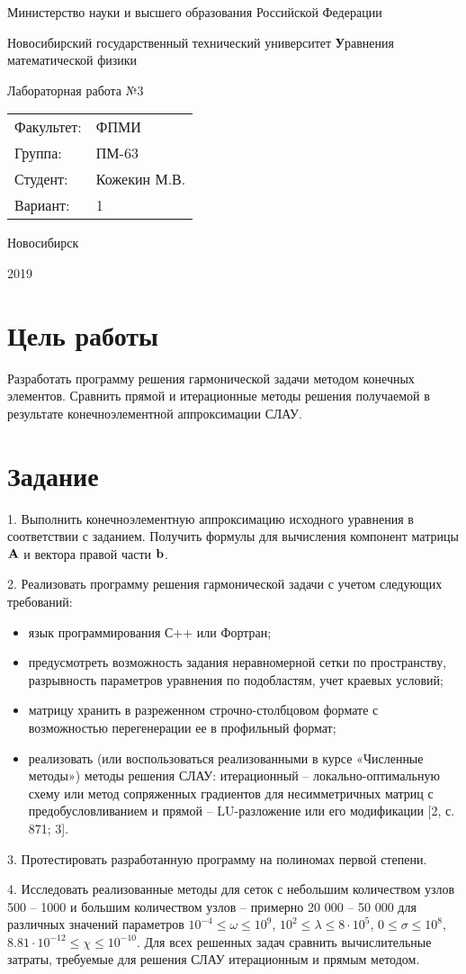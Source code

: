 \documentclass[12pt, a4paper]{article}
\newcommand{\insertTitle}[6]{
\begin{titlepage}
	\begin{center}
    	\large
		Министерство науки и высшего образования Российской Федерации
		
		Новосибирский государственный технический университет
		\vfill
		{\textbf #1}
		
		Лабораторная работа №#2
		\vfill
	\end{center}
	
	\begin{tabular}{ m{7em}  m{7em} }
	Факультет: & ФПМИ \\ 
	Группа: & #3 \\  
	Студент: & #4 \\
	Вариант: & #5
	\end{tabular}
	\vfill

\begin{center}
Новосибирск

#6
\end{center}
\end{titlepage}
}
\begin{document}
\setlength{\abovedisplayskip}{1pt}
\setlength{\belowdisplayskip}{1pt}

\insertTitle{Уравнения математической физики}{3}{ПМ-63}{Кожекин М.В.}{1}{2019}


\section{Цель работы}
Разработать программу решения гармонической задачи методом конечных элементов. Сравнить прямой и итерационные методы решения получаемой в результате конечноэлементной аппроксимации СЛАУ.


\section{Задание}

1.	Выполнить конечноэлементную аппроксимацию исходного уравнения в соответствии с заданием. Получить формулы для вычисления компонент матрицы ${\bf A}$ и вектора правой части ${\bf b}$. 

2.	Реализовать программу решения гармонической задачи с учетом следующих требований:
\begin{itemize}[noitemsep]
\item язык программирования С++ или Фортран;
\item предусмотреть возможность задания неравномерной сетки по пространству, разрывность параметров уравнения по подобластям, учет краевых условий;
\item матрицу хранить в разреженном строчно-столбцовом формате с возможностью перегенерации ее в профильный формат; 
\item реализовать (или воспользоваться реализованными в курсе «Численные методы») методы решения СЛАУ: итерационный – локально-оптимальную схему или метод сопряженных градиентов для несимметричных матриц с предобусловливанием и прямой – LU-разложение или его модификации [2, с. 871; 3].
\end{itemize}

3.	Протестировать разработанную программу на полиномах первой степени.

4.	Исследовать реализованные методы для сеток с небольшим количеством узлов 500 – 1000 и большим количеством узлов – примерно 20 000 – 50 000 для различных значений параметров $ 10^{-4} \leq \omega \leq 10^{9} $, $ 10^{2} \leq \lambda \leq 8\cdot10^{5} $, $ 0 \leq \sigma \leq 10^{8} $, $ 8.81 \cdot 10^{-12} \leq \chi \leq 10^{-10} $. Для всех решенных задач сравнить вычислительные затраты, требуемые для решения СЛАУ итерационным и прямым методом.
\end{document}
